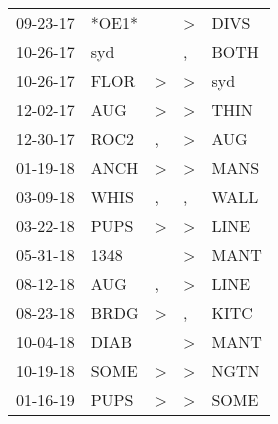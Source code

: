 \begin{supertabular}{p{0.07\textwidth}p{0.06\textwidth}p{0.02\textwidth}p{0.02\textwidth}p{0.06\textwidth}}
          09-23-17\textsuperscript{} &                            *OE1* &                  &     \textgreater &           DIVS\textsuperscript{} \\
          10-26-17\textsuperscript{} &            syd\textsuperscript{} &                  &                , &           BOTH\textsuperscript{} \\
          10-26-17\textsuperscript{} &           FLOR\textsuperscript{} &     \textgreater &     \textgreater &            syd\textsuperscript{} \\
          12-02-17\textsuperscript{} &            AUG\textsuperscript{} &     \textgreater &     \textgreater &           THIN\textsuperscript{} \\
          12-30-17\textsuperscript{} &           ROC2\textsuperscript{} &                , &     \textgreater &            AUG\textsuperscript{} \\
          01-19-18\textsuperscript{} &           ANCH\textsuperscript{} &     \textgreater &     \textgreater &           MANS\textsuperscript{} \\
          03-09-18\textsuperscript{} &           WHIS\textsuperscript{} &                , &                , &           WALL\textsuperscript{} \\
          03-22-18\textsuperscript{} &           PUPS\textsuperscript{} &     \textgreater &     \textgreater &           LINE\textsuperscript{} \\
          05-31-18\textsuperscript{} &           1348\textsuperscript{} &                  &     \textgreater &           MANT\textsuperscript{} \\
          08-12-18\textsuperscript{} &            AUG\textsuperscript{} &                , &     \textgreater &           LINE\textsuperscript{} \\
          08-23-18\textsuperscript{} &           BRDG\textsuperscript{} &     \textgreater &                , &           KITC\textsuperscript{} \\
          10-04-18\textsuperscript{} &           DIAB\textsuperscript{} &                  &     \textgreater &           MANT\textsuperscript{} \\
          10-19-18\textsuperscript{} &           SOME\textsuperscript{} &     \textgreater &     \textgreater &           NGTN\textsuperscript{} \\
          01-16-19\textsuperscript{} &           PUPS\textsuperscript{} &     \textgreater &     \textgreater &           SOME\textsuperscript{} \\

\end{supertabular}
